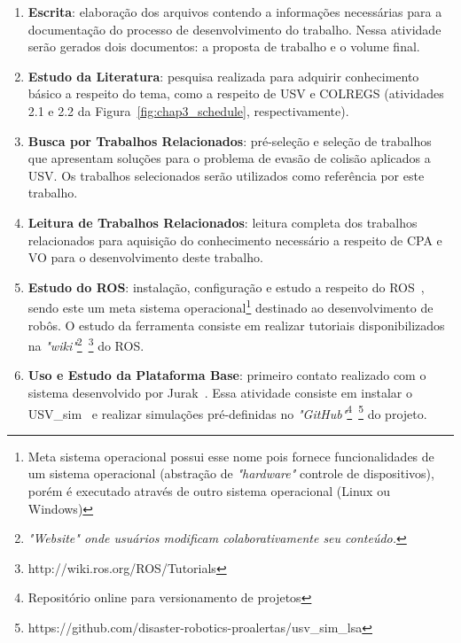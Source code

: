         \begin{enumerate}
            \item \textbf{Escrita}: elaboração dos arquivos contendo a informações necessárias para a documentação do processo de desenvolvimento do trabalho. Nessa atividade serão gerados dois documentos: a proposta de trabalho e o volume final.
            
            \item \textbf{Estudo da Literatura}: pesquisa realizada para adquirir conhecimento básico a respeito do tema, como a respeito de USV e COLREGS (atividades 2.1 e 2.2 da Figura~\ref{fig:chap3_schedule}, respectivamente).
            
            \item \textbf{Busca por Trabalhos Relacionados}: pré-seleção e seleção de trabalhos que apresentam soluções para o problema de evasão de colisão aplicados a USV. Os trabalhos selecionados serão utilizados como referência por este trabalho.
            
            \item \textbf{Leitura de Trabalhos Relacionados}: leitura completa dos trabalhos relacionados para aquisição do conhecimento necessário a respeito de CPA e VO para o desenvolvimento deste trabalho.
            
            \item \textbf{Estudo do ROS}: instalação, configuração e estudo a respeito do ROS~\cite{Quigley2009ROS}, sendo este um meta sistema operacional\footnote{Meta sistema operacional possui esse nome pois fornece funcionalidades de um sistema operacional (\ie abstração de \textit{"hardware"} controle de dispositivos), porém é executado através de outro sistema operacional (\ie Linux ou Windows)} destinado ao desenvolvimento de robôs. O estudo da ferramenta consiste em realizar tutoriais disponibilizados na \textit{"wiki"}\footnote{\textit{"Website" onde usuários modificam colaborativamente seu conteúdo.}}~\footnote{http://wiki.ros.org/ROS/Tutorials} do ROS.
            
            \item \textbf{Uso e Estudo da Plataforma Base}: primeiro contato realizado com o sistema desenvolvido por Jurak~\cite{JURAK2020}. Essa atividade consiste em instalar o USV\_sim~\cite{Paravisi2018Toward} e realizar simulações pré-definidas no \textit{"GitHub"}\footnote{Repositório online para versionamento de projetos}~\footnote{https://github.com/disaster-robotics-proalertas/usv\_sim\_lsa} do projeto.
            

\end{enumerate}
